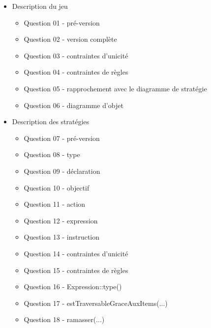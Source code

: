 \documentclass[oneside,a4paper]{book}
\begin{document}
\begin{itemize}[leftmargin=0cm,label={}]
    \item Description du jeu
    \begin{itemize}[leftmargin=0.25cm,label={}]
        \item Question 01 - pré-version \dotfill\pageref{Question 4.1.}
        \item Question 02 - version complète\dotfill\pageref{Question 4.2.}
        \item Question 03 - contraintes d'unicité\dotfill\pageref{Question 4.3.}
        \item Question 04 - contraintes de règles\dotfill\pageref{Question 4.4.}
        \item Question 05 - rapprochement avec le diagramme de stratégie\dotfill\pageref{Question 4.5.}
        \item Question 06 - diagramme d'objet\dotfill\pageref{Question 4.6.}
    \end{itemize}
    \item Description des stratégies
        \begin{itemize}[leftmargin=0.25cm,label={}]
            \item Question 07 - pré-version\dotfill\pageref{Question 4.7.}
            \item Question 08 - type\dotfill\pageref{Question 4.8.}
            \item Question 09 - déclaration\dotfill\pageref{Question 4.9.}
            \item Question 10 - objectif\dotfill\pageref{Question 4.10.}
            \item Question 11 - action\dotfill\pageref{Question 4.11.}
            \item Question 12 - expression\dotfill\pageref{Question 4.12.}
            \item Question 13 - instruction\dotfill\pageref{Question 4.13.}
            \item Question 14 - contraintes d'unicité\dotfill\pageref{Question 4.14.}
            \item Question 15 - contraintes de règles\dotfill\pageref{Question 4.15.}
            \item Question 16 - Expression::type()\dotfill\pageref{Question 4.16.}
            \item Question 17 - estTraversableGraceAuxItems(...)\dotfill\pageref{Question 4.17.}
            \item Question 18 - ramasser(...)\dotfill\pageref{Question 4.18.}

\end{itemize}
\end{itemize}
\end{document}
